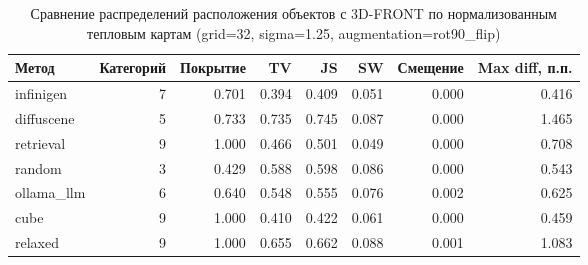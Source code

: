\begin{table}[h]
\centering
\small
\caption{Сравнение распределений расположения объектов с 3D-FRONT по нормализованным тепловым картам (grid=32, sigma=1.25, augmentation=rot90\_flip)}
\label{tab:layout\_heatmap\_metrics}
\begin{tabular}{lrrrrrrr}
\hline
Метод & Категорий & Покрытие & TV & JS & SW & Смещение & Max diff, п.п. \\
\hline
infinigen & 7 & 0.701 & 0.394 & 0.409 & 0.051 & 0.000 & 0.416 \\
diffuscene & 5 & 0.733 & 0.735 & 0.745 & 0.087 & 0.000 & 1.465 \\
retrieval & 9 & 1.000 & 0.466 & 0.501 & 0.049 & 0.000 & 0.708 \\
random & 3 & 0.429 & 0.588 & 0.598 & 0.086 & 0.000 & 0.543 \\
ollama\_llm & 6 & 0.640 & 0.548 & 0.555 & 0.076 & 0.002 & 0.625 \\
cube & 9 & 1.000 & 0.410 & 0.422 & 0.061 & 0.000 & 0.459 \\
relaxed & 9 & 1.000 & 0.655 & 0.662 & 0.088 & 0.001 & 1.083 \\
\hline
\end{tabular}
\end{table}
